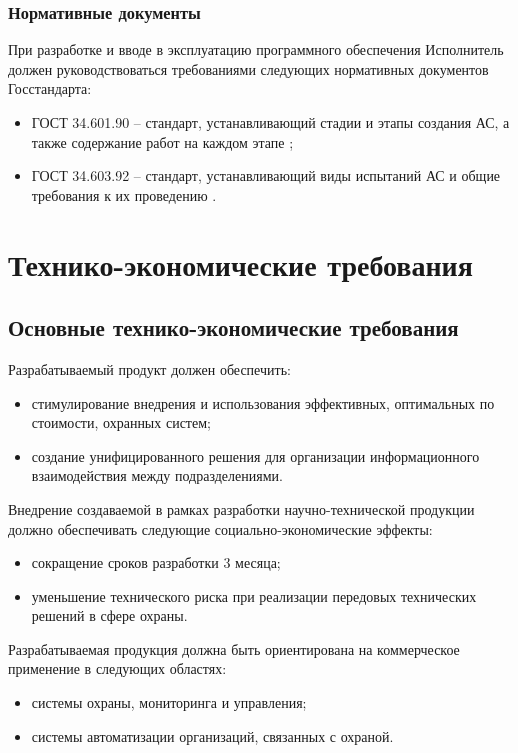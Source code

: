 			\subsubsection{Нормативные документы}
				При разработке и вводе в эксплуатацию программного обеспечения
				Исполнитель должен руководствоваться требованиями следующих
				нормативных документов Госстандарта:
				\begin{itemize}
				\changefontsizes[14pt]{14pt}
					\item ГОСТ 34.601.90 – стандарт, устанавливающий стадии и этапы создания АС, а также содержание работ на каждом этапе \cite{gost90};
					\item ГОСТ 34.603.92 – стандарт, устанавливающий виды испытаний АС и общие требования к их проведению \cite{gost92}.
				\end{itemize}
	\section{Технико-экономические требования}
		\subsection{Основные технико-экономические требования}
			Разрабатываемый продукт должен обеспечить:
			\begin{itemize}
				\changefontsizes[14pt]{14pt}
				\item стимулирование внедрения и использования эффективных, оптимальных по стоимости, охранных систем;
				\item создание унифицированного решения для организации информационного взаимодействия между подразделениями.
			\end{itemize}
			Внедрение создаваемой в рамках разработки научно-технической продукции должно обеспечивать следующие социально-экономические эффекты:
			\begin{itemize}
				\changefontsizes[14pt]{14pt}
				\item сокращение сроков разработки 3 месяца;
				\item уменьшение технического риска при реализации передовых технических решений в сфере охраны.
			\end{itemize}
			Разрабатываемая продукция должна быть ориентирована на коммерческое применение в следующих областях:
			\begin{itemize}
				\changefontsizes[14pt]{14pt}
				\item системы охраны, мониторинга и управления;
				\item системы автоматизации организаций, связанных с охраной.
			\end{itemize}

